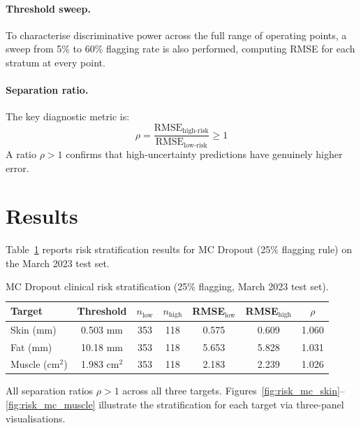 \documentclass[12pt, a4paper, oneside]{report}
\begin{document}
\paragraph{Threshold sweep.} To characterise discriminative power across the full range of operating points, a sweep from 5\% to 60\% flagging rate is also performed, computing RMSE for each stratum at every point.

\paragraph{Separation ratio.} The key diagnostic metric is:
\begin{equation}
  \rho = \frac{\mathrm{RMSE}_{\mathrm{high\text{-}risk}}}{\mathrm{RMSE}_{\mathrm{low\text{-}risk}}} \geq 1
\end{equation}
A ratio $\rho > 1$ confirms that high-uncertainty predictions have genuinely higher error.

\section{Results}

Table~\ref{tab:risk_mc} reports risk stratification results for MC Dropout (25\% flagging rule) on the March 2023 test set.

\begin{table}[H]
  \centering
  \caption{MC Dropout clinical risk stratification (25\% flagging, March 2023 test set).}
  \label{tab:risk_mc}
  \begin{tabular}{lcccccc}
    \toprule
    \textbf{Target} & \textbf{Threshold} & \textbf{$n_{\mathrm{low}}$} & \textbf{$n_{\mathrm{high}}$} &
    \textbf{RMSE$_{\mathrm{low}}$} & \textbf{RMSE$_{\mathrm{high}}$} & \textbf{$\rho$} \\
    \midrule
    Skin (mm)       & 0.503 mm   & 353 & 118 & 0.575 & 0.609 & 1.060 \\
    Fat (mm)        & 10.18 mm   & 353 & 118 & 5.653 & 5.828 & 1.031 \\
    Muscle (cm$^2$) & 1.983 cm$^2$ & 353 & 118 & 2.183 & 2.239 & 1.026 \\
    \bottomrule
  \end{tabular}
\end{table}

All separation ratios $\rho > 1$ across all three targets. Figures~\ref{fig:risk_mc_skin}--\ref{fig:risk_mc_muscle} illustrate the stratification for each target via three-panel visualisations.
\end{document}
